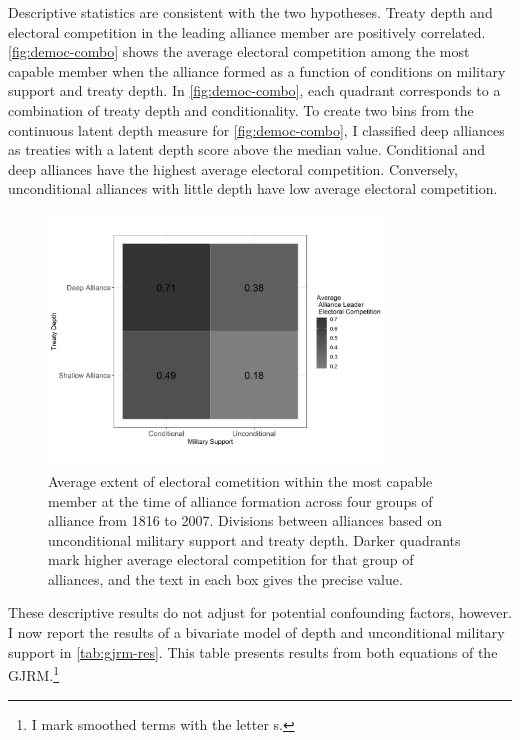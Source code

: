\documentclass[12pt]{article}
\begin{document}
Descriptive statistics are consistent with the two hypotheses.
Treaty depth and electoral competition in the leading alliance member are positively correlated. 
\autoref{fig:democ-combo} shows the average electoral competition among the most capable member when the alliance formed as a function of conditions on military support and treaty depth.
In \autoref{fig:democ-combo}, each quadrant corresponds to a combination of treaty depth and conditionality. 
To create two bins from the continuous latent depth measure for \autoref{fig:democ-combo}, I classified deep alliances as treaties with a latent depth score above the median value. 
Conditional and deep alliances have the highest average electoral competition. 
Conversely, unconditional alliances with little depth have low average electoral competition.


\begin{figure}[hbtp]
\centering
\includegraphics[width=0.8\textwidth]{../figures/democ-combo.png}
\caption{Average extent of electoral cometition within the most capable member at the time of alliance formation across four groups of alliance from 1816 to 2007. Divisions between alliances based on unconditional military support and treaty depth. Darker quadrants mark higher average electoral competition for that group of alliances, and the text in each box gives the precise value.}
\label{fig:democ-combo}
\end{figure}


These descriptive results do not adjust for potential confounding factors, however.
I now report the results of a bivariate model of depth and unconditional military support in \autoref{tab:gjrm-res}. 
This table presents results from both equations of the GJRM.\footnote{I mark smoothed terms with the letter s.} 
\end{document}
